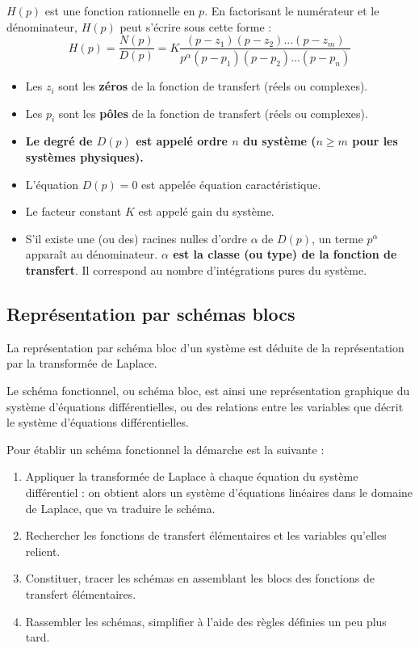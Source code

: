 \documentclass[11pt,oneside]{article}
\begin{document}
\begin{props}
$H(p)$ est une fonction rationnelle en $p$. En factorisant le numérateur et le
dénominateur, $H(p)$ peut s'écrire sous cette forme :
$$
H(p) = \dfrac{N(p)}{D(p)} =
K \dfrac{\left(p-z_1 \right)\left(p-z_2 \right)...\left(p-z_m \right)}{
p^{\alpha} \left(p-p_1 \right)\left(p-p_2 \right)...\left(p-p_n \right)}
$$


 \begin{itemize}
 \item Les $z_i$ sont les \textbf{zéros} de la fonction de transfert (réels ou
complexes).
\item Les $p_i$ sont les \textbf{pôles} de la fonction de transfert (réels ou
complexes).
\item \textbf{Le degré de $D(p)$ est appelé ordre $n$ du système ($n\geq m$ pour les
systèmes physiques).}
\item L'équation $D(p)=0$ est appelée équation caractéristique.
\item Le facteur constant $K$ est appelé gain du système.
\item S'il existe une (ou des) racines nulles d'ordre $\alpha$ de $D(p)$, un
terme $p^\alpha$ apparaît au dénominateur. \textbf{$\alpha$ est la classe (ou type) de
la fonction de transfert}. Il correspond au nombre d'intégrations pures du
système.
\end{itemize}
\end{props}



\subsection{Représentation par schémas blocs}
La représentation par schéma bloc d’un système est déduite de la représentation
par la transformée de Laplace.

Le schéma fonctionnel, ou schéma bloc, est ainsi une représentation graphique du
système d’équations différentielles, ou des relations entre les variables que
décrit le système d’équations différentielles.

\begin{methode}
Pour établir un schéma fonctionnel la démarche est la suivante :
\begin{enumerate}
\item Appliquer la transformée de Laplace à chaque équation du système différentiel : on obtient alors un système d’équations linéaires
dans le domaine de Laplace, que va traduire le schéma.
\item Rechercher les fonctions de transfert élémentaires et les variables qu’elles relient.
\item Constituer, tracer les schémas en assemblant les blocs des fonctions de transfert élémentaires.
\item Rassembler les schémas, simplifier à l’aide des règles définies un peu plus tard.
\end{enumerate}

\end{methode}
\end{document}
